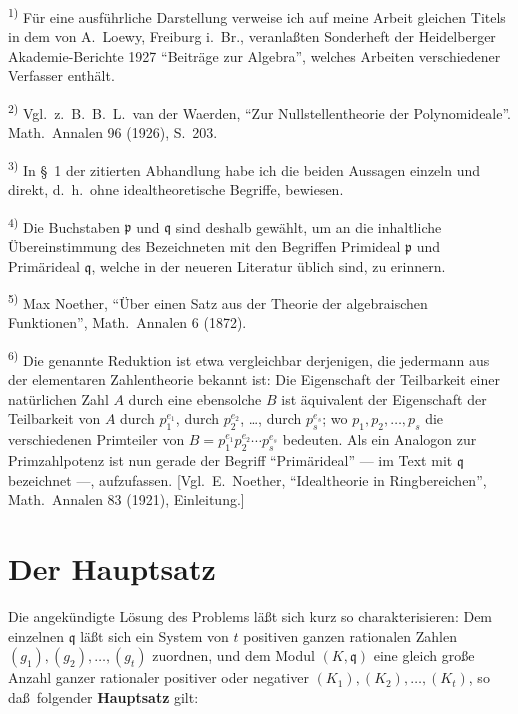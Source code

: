 \documentclass[12pt,a4paper]{article}
\theoremstyle{plain}
\theoremstyle{definition}
\theoremstyle{remark}
\begin{document}
{\footnotesize
\textsuperscript{1)} F\"ur eine ausf\"uhrliche Darstellung verweise ich auf meine Arbeit gleichen
Titels in dem von A.\ Loewy, Freiburg i.\ Br., veranla\ss ten Sonderheft der
Heidelberger Akademie-Berichte 1927 ``Beitr\"age zur Algebra'', welches
Arbeiten verschiedener Verfasser enth\"alt.

\textsuperscript{2)} Vgl.\ z.\ B.\ B.\ L.\ van der Waerden, ``Zur Nullstellentheorie der Polynomideale''.
Math.\ Annalen 96 (1926), S.~203.

\textsuperscript{3)} In \S~1 der zitierten Abhandlung habe ich die beiden Aussagen einzeln und direkt,
d.\ h.\ ohne idealtheoretische Begriffe, bewiesen.

\textsuperscript{4)} Die Buchstaben $\mathfrak{p}$ und $\mathfrak{q}$ sind deshalb gew\"ahlt, um an die inhaltliche
\"Ubereinstimmung des Bezeichneten mit den Begriffen Primideal $\mathfrak{p}$ und
Prim\"arideal $\mathfrak{q}$, welche in der neueren Literatur \"ublich sind, zu erinnern.

\textsuperscript{5)} Max Noether, ``\"Uber einen Satz aus der Theorie der algebraischen Funktionen'',
Math.\ Annalen 6 (1872).

\textsuperscript{6)} Die genannte Reduktion ist etwa vergleichbar derjenigen, die jedermann aus
der elementaren Zahlentheorie bekannt ist: Die Eigenschaft der Teilbarkeit
einer nat\"urlichen Zahl $A$ durch eine ebensolche $B$ ist \"aquivalent der
Eigenschaft der Teilbarkeit von $A$ durch $p_{1}^{e_{1}}$, durch
$p_{2}^{e_{2}}$, \ldots, durch $p_{s}^{e_{s}}$; wo
$p_{1}, p_{2}, \ldots, p_{s}$ die verschiedenen Primteiler von
$B = p_{1}^{e_{1}}p_{2}^{e_{2}} \cdots p_{s}^{e_{s}}$ bedeuten. Als ein Analogon zur
Primzahlpotenz ist nun gerade der Begriff ``Prim\"arideal'' --- im Text mit
$\mathfrak{q}$ bezeichnet ---, aufzufassen. [Vgl.\ E.\ Noether, ``Idealtheorie in
Ringbereichen'', Math.\ Annalen 83 (1921), Einleitung.]
}

\newpage
\section*{Der Hauptsatz}

Die angek\"undigte L\"osung des Problems l\"a\ss t sich kurz so
charakterisieren: Dem einzelnen $\mathfrak{q}$ l\"a\ss t sich ein System von $t$
positiven ganzen rationalen Zahlen $(g_{1}), (g_{2}), \ldots, (g_{t})$
zuordnen, und dem Modul $(K, \mathfrak{q})$ eine gleich gro\ss e Anzahl ganzer
rationaler positiver oder negativer $(K_{1}), (K_{2}), \ldots, (K_{t})$, so
da\ss\ folgender \textbf{Hauptsatz} gilt:
\end{document}
